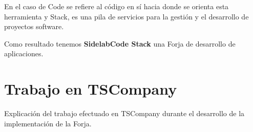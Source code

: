 \par En el caso de Code se refiere al código en sí hacia donde se orienta esta herramienta y Stack, es una pila de servicios para la gestión y el desarrollo de proyectos software.

\par Como resultado tenemos \textbf{SidelabCode Stack} una Forja de desarrollo de aplicaciones.


\section{Trabajo en TSCompany}
\label{sec:trabajo-tscompany}

\par Explicación del trabajo efectuado en TSCompany durante el desarrollo de la implementación de la Forja.

